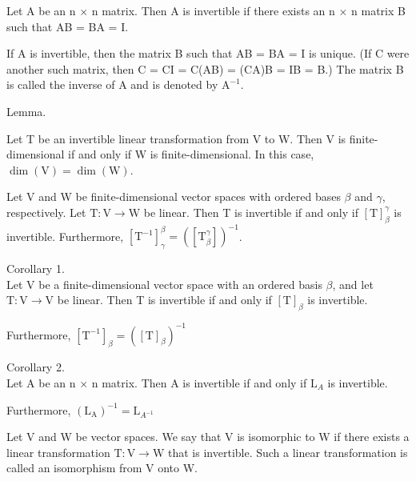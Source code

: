 \begin{defn}$ $\\
	Let A be an n $\times$ n matrix. Then A is invertible if there exists an n $\times$ n matrix B such that AB = BA = I.
	
	
  If A is invertible, then the matrix B such that AB = BA = I is unique. (If C were another such matrix, then C = CI = C(AB) = (CA)B = IB = B.) The matrix B is called the inverse of A and is denoted by $\mathrm{A}^{-1}$.

\end{defn}



Lemma. 

 Let T be an invertible linear transformation from V to W. Then V is finite-dimensional if and only if W is finite-dimensional. In this case, $\dim(\mathrm{V}) = \dim(\mathrm{W})$.


\newpage

\begin{thm*}[2.18]$ $\\
	Let V and W be finite-dimensional vector spaces with ordered bases $\beta$ and $\gamma$, respectively. Let $\mathrm{T} : \mathrm{V} \rightarrow \mathrm{W}$ be linear. Then T is invertible if and only if $[\mathrm{T}]^\gamma_\beta$ is invertible. Furthermore, $[\mathrm{T}^{-1}]^\beta_\gamma = ([\mathrm{T}^\gamma_\beta])^{-1}$.
	
\end{thm*}

Corollary 1. $ $\\
Let V be a finite-dimensional vector space with an ordered basis $\beta$, and let $\mathrm{T} : \mathrm{V} \rightarrow \mathrm{V}$ be linear. Then T is invertible if and only if $[\mathrm{T}]_\beta$ is invertible.

 Furthermore, $[\mathrm{T}^{-1}]_\beta = ([\mathrm{T}]_\beta)^{-1}$


Corollary 2. $ $\\
Let A be an n $\times$ n matrix. Then A is invertible if and only
if $\mathrm{L}_A$ is invertible.

 Furthermore, $(\mathrm{L_A})^{-1} = \mathrm{L}_{A^{-1}}$

\begin{defn}$ $\\
	Let V and W be vector spaces. We say that V is isomorphic to W if there exists a linear transformation $\mathrm{T} : \mathrm{V} \rightarrow \mathrm{W}$ that is invertible. Such a linear transformation is called an isomorphism from V onto W.
\end{defn}

